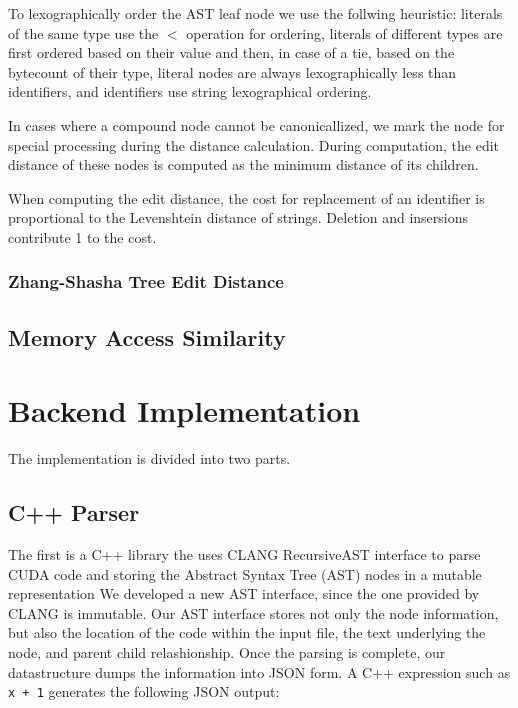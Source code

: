 \documentclass[nocopyrightspace]{sigchi}
\begin{document}
To lexographically order the AST leaf node we use the follwing heuristic:
literals of the same type use the $<$ operation for ordering,
literals of different types are first ordered based on their value and then,
in case of a tie, based on the bytecount of their type, literal nodes are always lexographically
less than identifiers, and identifiers use string lexographical ordering.

In cases where a compound node cannot be canonicallized, we mark the node for
special processing during the distance calculation. During computation, the edit
distance of these nodes is computed as the minimum distance of its children.

When computing the edit distance, the cost for replacement of an identifier is
proportional to the Levenshtein distance of strings. Deletion and insersions
contribute 1 to the cost.

\subsubsection{Zhang-Shasha Tree Edit Distance}



\subsection{Memory Access Similarity}



\section{Backend Implementation}

The implementation is divided into two parts.


\subsection{C++ Parser}

The first is a C++ library the uses CLANG RecursiveAST interface to parse CUDA code
and storing the Abstract Syntax Tree (AST) nodes in a mutable representation
We developed a new AST interface, since the one provided by CLANG is immutable.
Our AST interface stores not only the node information, but also the location
of the code within the input file, the text underlying the node, and parent child
relashionship. Once the parsing is complete, our datastructure dumps the information
into JSON form. A C++ expression such as {\tt x + 1} generates the following JSON
output:
\end{document}
